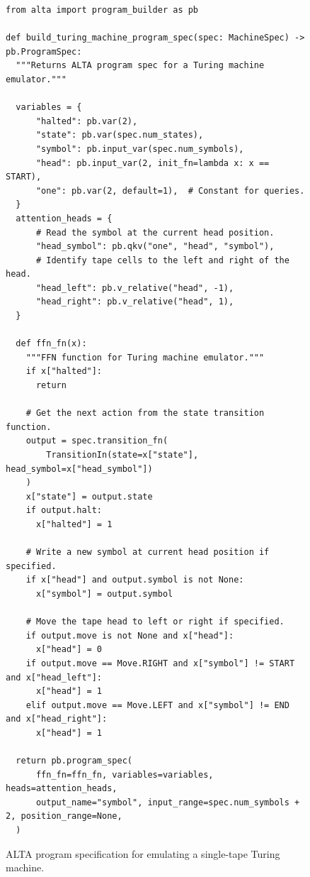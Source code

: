 \begin{figure}[ht]
\centering
\begin{verbatim}
from alta import program_builder as pb

def build_turing_machine_program_spec(spec: MachineSpec) -> pb.ProgramSpec:
  """Returns ALTA program spec for a Turing machine emulator."""

  variables = {
      "halted": pb.var(2),
      "state": pb.var(spec.num_states),
      "symbol": pb.input_var(spec.num_symbols),
      "head": pb.input_var(2, init_fn=lambda x: x == START),
      "one": pb.var(2, default=1),  # Constant for queries.
  }
  attention_heads = {
      # Read the symbol at the current head position.
      "head_symbol": pb.qkv("one", "head", "symbol"),
      # Identify tape cells to the left and right of the head.
      "head_left": pb.v_relative("head", -1),
      "head_right": pb.v_relative("head", 1),
  }

  def ffn_fn(x):
    """FFN function for Turing machine emulator."""
    if x["halted"]:
      return

    # Get the next action from the state transition function.
    output = spec.transition_fn(
        TransitionIn(state=x["state"], head_symbol=x["head_symbol"])
    )
    x["state"] = output.state
    if output.halt:
      x["halted"] = 1

    # Write a new symbol at current head position if specified.
    if x["head"] and output.symbol is not None:
      x["symbol"] = output.symbol

    # Move the tape head to left or right if specified.
    if output.move is not None and x["head"]:
      x["head"] = 0
    if output.move == Move.RIGHT and x["symbol"] != START and x["head_left"]:
      x["head"] = 1
    elif output.move == Move.LEFT and x["symbol"] != END and x["head_right"]:
      x["head"] = 1

  return pb.program_spec(
      ffn_fn=ffn_fn, variables=variables, heads=attention_heads,
      output_name="symbol", input_range=spec.num_symbols + 2, position_range=None,
  )
\end{verbatim}
\caption{ALTA program specification for emulating a single-tape Turing machine.}
\label{fig:single_tape}
\end{figure}
